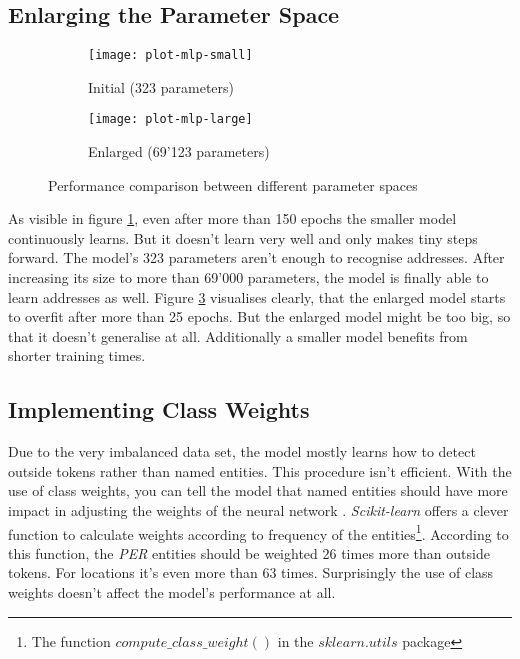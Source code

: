 \subsection{Enlarging the Parameter Space}

\begin{figure}[!ht]
    \begin{subfigure}{0.5\textwidth}
        \texttt{[image: plot-mlp-small]}
        \caption{Initial (323 parameters)}
        \label{fig:plot-mlp-small}
    \end{subfigure}
    \begin{subfigure}{0.5\textwidth}
        \texttt{[image: plot-mlp-large]}
        \caption{Enlarged (69'123 parameters)}
        \label{fig:plot-mlp-large}
    \end{subfigure}
    \caption{Performance comparison between different parameter spaces}
\end{figure}

As visible in figure \ref{fig:plot-mlp-small}, even after more than 150 epochs the smaller model continuously learns. But it doesn't learn very well and only makes tiny steps forward. The model's 323 parameters aren't enough to recognise addresses. After increasing its size to more than 69'000 parameters, the model is finally able to learn addresses as well. Figure \ref{fig:plot-mlp-large} visualises clearly, that the enlarged model starts to overfit after more than 25 epochs. But the enlarged model might be too big, so that it doesn't generalise at all. Additionally a smaller model benefits from shorter training times.

\subsection{Implementing Class Weights}

Due to the very imbalanced data set, the model mostly learns how to detect outside tokens rather than named entities. This procedure isn't efficient. With the use of class weights, you can tell the model that named entities should have more impact in adjusting the weights of the neural network \cite{imb18}. \emph{Scikit-learn} offers a clever function to calculate weights according to frequency of the entities\footnote{The function $compute\_class\_weight()$ in the $sklearn.utils$ package}. According to this function, the \emph{PER} entities should be weighted 26 times more than outside tokens. For locations it's even more than 63 times. Surprisingly the use of class weights doesn't affect the model's performance at all.

